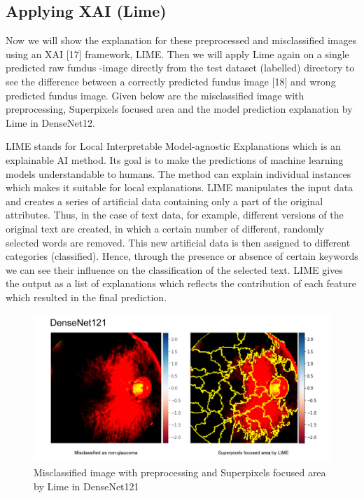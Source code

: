 \documentclass[conference]{IEEEtran}
\begin{document}
\subsection{Applying XAI (Lime)}

 Now we will show the explanation for these preprocessed and misclassified images using an XAI [17] framework, LIME. Then we will apply Lime again on a single predicted raw fundus -image directly from the test dataset (labelled) directory to see the difference between a correctly predicted fundus image [18] and wrong predicted fundus image. Given below are the misclassified image with preprocessing, Superpixels focused area and the model prediction explanation by Lime in DenseNet12.

\noindent LIME stands for Local Interpretable Model-agnostic Explanations which is an explainable AI method. Its goal is to make the predictions of machine learning models understandable to humans. The method can explain individual instances which makes it suitable for local explanations. LIME manipulates the input data and creates a series of artificial data containing only a part of the original attributes. Thus, in the case of text data, for example, different versions of the original text are created, in which a certain number of different, randomly selected words are removed. This new artificial data is then assigned to different categories (classified). Hence, through the presence or absence of certain keywords we can see their influence on the classification of the selected text. LIME gives the output as a list of explanations which reflects the contribution of each feature which resulted in the final prediction.

\begin{figure}[hbt!]
\centering
\includegraphics[scale=0.24]{fig-42.png}
\caption{Misclassified image with preprocessing and Superpixels focused area by Lime in DenseNet121}
\label{fig:x Misclassified image with preprocessing and Superpixels focused area by Lime in DenseNet121}
\end{figure}
\end{document}
